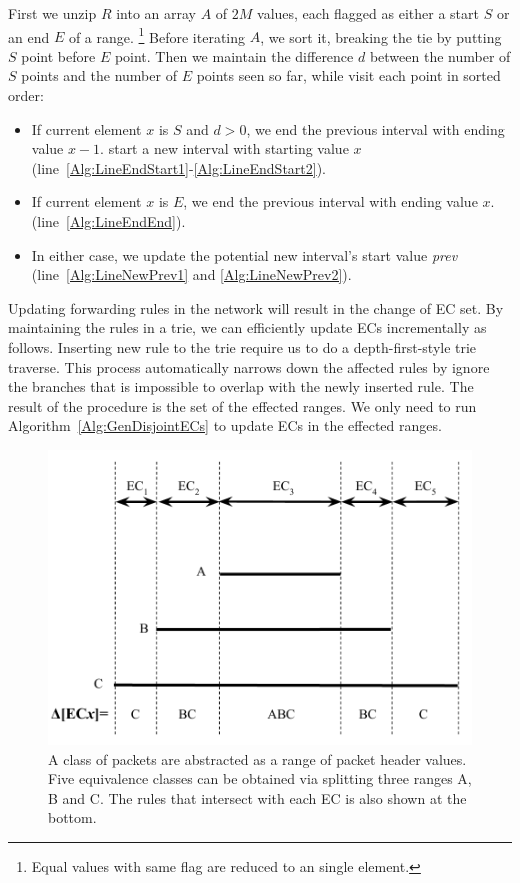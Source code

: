 First we unzip $R$ into an array $A$ of $2M$ values,
each flagged as either a start $S$ or an end $E$ of a range.
\footnote{Equal values with same flag are reduced to an single element.}
Before iterating $A$, we sort it, breaking the tie by putting $S$ point before $E$ point.
Then we maintain the difference $d$ between the number of $S$ points and the number of $E$ points
seen so far, while visit each point in sorted order:
\begin{itemize}
\item If current element $x$ is $S$ and $d > 0$,
        we end the previous interval with ending value $x - 1$.
        start a new interval with starting value $x$
        (line~\ref{Alg:LineEndStart1}-\ref{Alg:LineEndStart2}).
\item If current element $x$ is $E$, we end the previous interval with ending value $x$.
        (line~\ref{Alg:LineEndEnd}).
\item In either case, we update the potential new interval's start value \textit{prev}
        (line~\ref{Alg:LineNewPrev1} and \ref{Alg:LineNewPrev2}).
\end{itemize}

Updating forwarding rules in the network will result in the change of EC set.
By maintaining the rules in a trie, we can efficiently update ECs
incrementally as follows.
Inserting new rule to the trie require us to do a depth-first-style trie traverse.
This process automatically narrows down the affected rules by ignore the branches
that is impossible to overlap with the newly inserted rule.
The result of the procedure is the set of the effected ranges.
We only need to run Algorithm~\ref{Alg:GenDisjointECs} to update ECs in the effected ranges.

\begin{figure}[t]
\centering
\includegraphics[scale=.52]{figures/DisjointECs.pdf}
\caption{A class of packets are abstracted as a range of packet header values.
        Five equivalence classes can be obtained via splitting three ranges A, B and C.
        The rules that intersect with each EC is also shown at the bottom.}
\label{Fig:DisjointECsAsInterval}
\end{figure}

